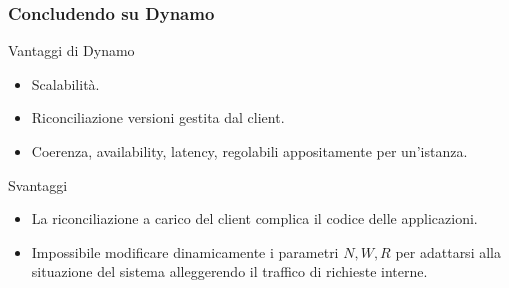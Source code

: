 

\begin{frame}
  \frametitle{Concludendo su Dynamo}
  \begin{block}{Vantaggi di Dynamo}
    \begin{itemize}
    \item Scalabilità.
    \item Riconciliazione versioni gestita dal client.
    \item Coerenza, availability, latency, regolabili appositamente per un'istanza.
    \end{itemize}
  \end{block}
  \begin{block}{Svantaggi}
  \begin{itemize}
  \item La riconciliazione a carico del client complica il codice delle applicazioni.
  \item Impossibile modificare dinamicamente i parametri $N, W, R$ per adattarsi alla situazione del sistema alleggerendo il traffico di richieste interne.
  \end{itemize}
  \end{block}
\end{frame}

